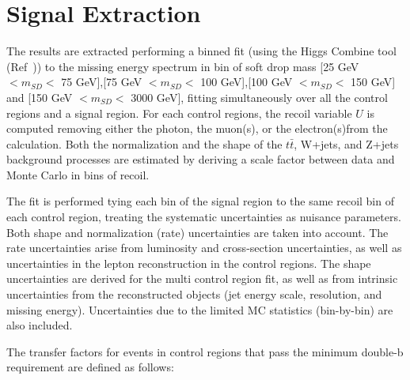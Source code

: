 \clearpage
\section{Signal Extraction}
\label{sec:fitdesc}
The results are extracted performing a binned fit (using the Higgs Combine tool (Ref~\cite{COMBINE})) to the missing energy spectrum in bin of soft drop mass [25 GeV $< m_{SD} <$ 75 GeV],[75 GeV $< m_{SD} <$ 100 GeV],[100 GeV $< m_{SD} <$ 150 GeV] and [150 GeV $< m_{SD} <$ 3000 GeV], fitting simultaneously over all the control regions and a signal region.
For each control regions, the recoil variable $U$ is computed removing either the photon, the muon(s), or the electron(s)from the \MET calculation. Both the normalization and the shape of the $t\bar{t}$, W+jets, and Z+jets background processes are estimated by deriving a scale factor between data and Monte Carlo in bins of recoil. 

 The fit is performed tying each \MET bin of the signal region to the same recoil bin of each control region, treating the systematic uncertainties as nuisance parameters. 
Both shape and normalization (rate) uncertainties are taken into account. The rate uncertainties arise from luminosity and cross-section uncertainties, as well as uncertainties in the lepton reconstruction in the control regions. The shape uncertainties are derived for the multi control region fit, as well as from intrinsic uncertainties from the reconstructed objects (jet energy scale, resolution, and missing energy). Uncertainties due to the limited MC statistics (bin-by-bin) are also included.


The transfer factors for events in control regions that pass the minimum double-b requirement are defined as follows:

